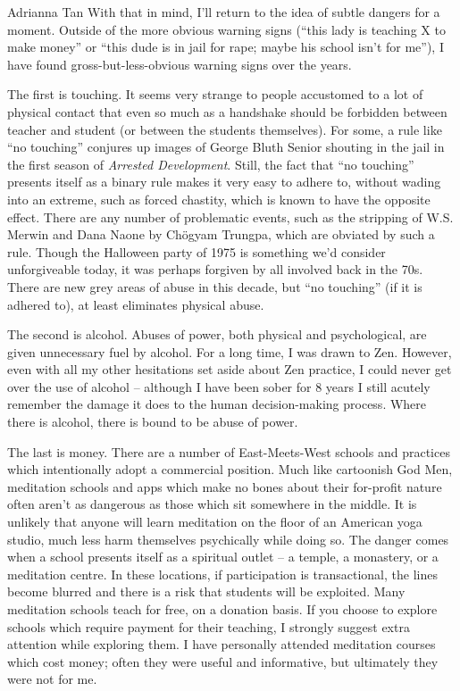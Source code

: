 \documentclass{letter}
\begin{document}
\begin{letter}{Adrianna Tan}
With that in mind, I'll return to the idea of subtle dangers for a moment.
Outside of the more obvious warning signs (``this lady is teaching X to make money'' or ``this dude is in jail for rape; maybe his school isn't for me''), I have found gross-but-less-obvious warning signs over the years.

The first is touching.
It seems very strange to people accustomed to a lot of physical contact that even so much as a handshake should be forbidden between teacher and student (or between the students themselves).
For some, a rule like ``no touching'' conjures up images of George Bluth Senior shouting in the jail in the first season of \textit{Arrested Development}.
Still, the fact that ``no touching'' presents itself as a binary rule makes it very easy to adhere to, without wading into an extreme, such as forced chastity, which is known to have the opposite effect.
There are any number of problematic events, such as the stripping of W.S. Merwin and Dana Naone by Chögyam Trungpa, which are obviated by such a rule.
Though the Halloween party of 1975 is something we'd consider unforgiveable today, it was perhaps forgiven by all involved back in the 70s.
There are new grey areas of abuse in this decade, but ``no touching'' (if it is adhered to), at least eliminates physical abuse.

The second is alcohol.
Abuses of power, both physical and psychological, are given unnecessary fuel by alcohol.
For a long time, I was drawn to Zen.
However, even with all my other hesitations set aside about Zen practice, I could never get over the use of alcohol -- although I have been sober for 8 years I still acutely remember the damage it does to the human decision-making process.
Where there is alcohol, there is bound to be abuse of power.

The last is money.
There are a number of East-Meets-West schools and practices which intentionally adopt a commercial position.
Much like cartoonish God Men, meditation schools and apps which make no bones about their for-profit nature often aren't as dangerous as those which sit somewhere in the middle.
It is unlikely that anyone will learn meditation on the floor of an American yoga studio, much less harm themselves psychically while doing so.
The danger comes when a school presents itself as a spiritual outlet -- a temple, a monastery, or a meditation centre.
In these locations, if participation is transactional, the lines become blurred and there is a risk that students will be exploited.
Many meditation schools teach for free, on a donation basis.
If you choose to explore schools which require payment for their teaching, I strongly suggest extra attention while exploring them.
I have personally attended meditation courses which cost money; often they were useful and informative, but ultimately they were not for me.


\end{letter}
\end{document}
